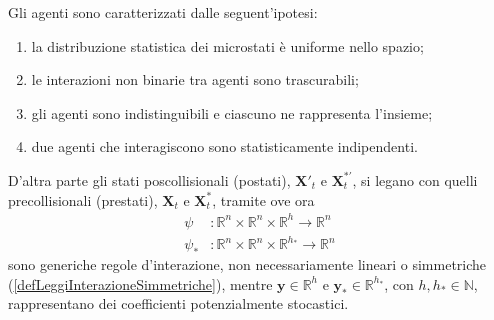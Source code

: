         \begin{ipo}
          \label{ipTipoBoltzmann}
          Gli agenti sono caratterizzati dalle seguent'ipotesi:

          \begin{enumerate}[
            label=B\arabic*,
          ]
            \item\label{ipTipoBoltzmannDensitàOmogenea} la distribuzione statistica dei microstati è uniforme nello spazio;
            \item\label{ipTipoBoltzmannInterazioniBinarie} le interazioni non binarie tra agenti sono trascurabili;
            \item\label{ipTipoBoltzmannAgentiIndistinguibili} gli agenti sono indistinguibili e ciascuno ne rappresenta l'insieme;
            \item\label{ipTipoBoltzmannCaoMolecolare} due agenti che interagiscono sono statisticamente indipendenti.
          \end{enumerate}
        \end{ipo}

        D'altra parte gli stati poscollisionali (postati), \(\mathbf X'_t\) e \(\mathbf X^{*\prime}_t\), si legano con quelli precollisionali (prestati), \(\mathbf X_t\) e \(\mathbf X^*_t\), tramite
        ove ora
        \[
          \begin{aligned}
            \psi&\colon\mathbb R^n\times\mathbb R^n\times\mathbb R^h\to\mathbb R^n\\
            \psi_*&\colon\mathbb R^n\times\mathbb R^n\times\mathbb R^{h_*}\to\mathbb R^n
          \end{aligned}
        \]
        sono generiche regole d'interazione, non necessariamente lineari o simmetriche (\cref{defLeggiInterazioneSimmetriche}), mentre \(\mathbf y\in\mathbb R^h\) e \(\mathbf y_*\in\mathbb R^{h_*}\), con \(h,h_*\in\mathbb N\), rappresentano dei coefficienti potenzialmente stocastici.

